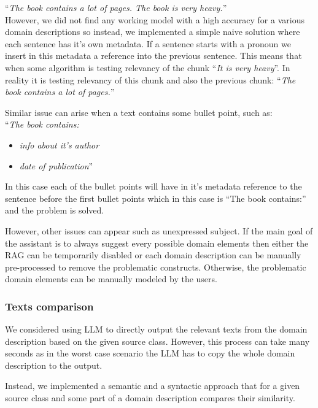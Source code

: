\noindent{}``\textit{The book contains a lot of pages. The book is very heavy.}'' \\

\noindent{}However, we did not find any working model with a high accuracy for a various domain descriptions so instead, we implemented a simple naive solution where each sentence has it's own metadata. If a sentence starts with a pronoun we insert in this metadata a reference into the previous sentence. This means that when some algorithm is testing relevancy of the chunk ``\textit{It is very heavy}''. In reality it is testing relevancy of this chunk and also the previous chunk: ``\textit{The book contains a lot of pages.}''

Similar issue can arise when a text contains some bullet point, such as: \\

\noindent{}``\textit{The book contains:}
\begin{itemize}
\item \textit{info about it's author}
\item \textit{date of publication}'' \\
\end{itemize}

\noindent{}In this case each of the bullet points will have in it's metadata reference to the sentence before the first bullet points which in this case is ``The book contains:'' and the problem is solved.

However, other issues can appear such as unexpressed subject. If the main goal of the assistant is to always suggest every possible domain elements then either the RAG can be temporarily disabled or each domain description can be manually pre-processed to remove the problematic constructs. Otherwise, the problematic domain elements can be manually modeled by the users.


\subsubsection{Texts comparison}
\label{texts_comparison}
  
We considered using LLM to directly output the relevant texts from the domain description based on the given source class. However, this process can take many seconds as in the worst case scenario the LLM has to copy the whole domain description to the output.

Instead, we implemented a semantic and a syntactic approach that for a given source class and some part of a domain description compares their similarity.
 
